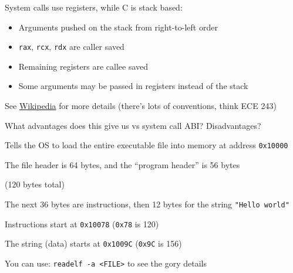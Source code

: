 \begin{slide}
  

  System calls use registers, while C is stack based:

  \begin{itemize}
    \item Arguments pushed on the stack from right-to-left order
    \item \texttt{rax}, \texttt{rcx}, \texttt{rdx} are caller saved
    \item Remaining registers are callee saved
    \item Some arguments may be passed in registers instead of the stack
  \end{itemize}
  \medskip

  See \href{https://en.wikipedia.org/wiki/X86_calling_conventions}{Wikipedia}
  for more details (there's lots of conventions, think ECE 243)
  \bigskip

  What advantages does this give us vs system call ABI? Disadvantages?
\end{slide}


\begin{slide}
  

  Tells the OS to load the entire executable file into memory at
  address \texttt{0x10000}
  \medskip

  The file header is 64 bytes, and the ``program header'' is 56 bytes

  (120 bytes total)
  \medskip

  The next 36 bytes are instructions, then 12 bytes for the string
  \texttt{"Hello world\n"}

  \leftspace{}Instructions start at \texttt{0x10078} (\texttt{0x78} is 120)

  \leftspace{}The string (data) starts at \texttt{0x1009C} (\texttt{0x9C} is 156)
  \medskip

  You can use: \texttt{readelf -a <FILE>} to see the gory details
\end{slide}

